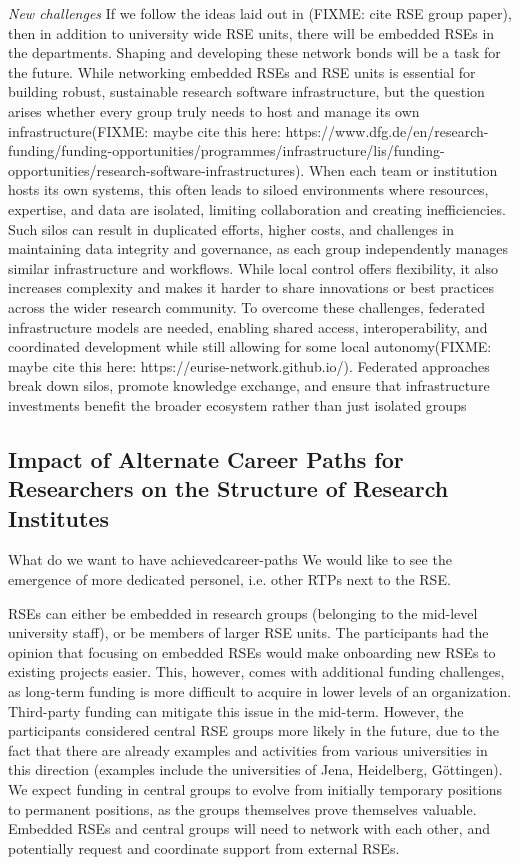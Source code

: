 \documentclass{eceasst}
\begin{document}
\emph{New challenges}
If we follow the ideas laid out in (FIXME: cite RSE group paper), then in addition to university wide RSE units,
there will be embedded RSEs in the departments. Shaping and developing these network bonds will be a task for the future.
While networking embedded RSEs and RSE units is essential for building robust, sustainable research software infrastructure, but the question arises whether every group truly needs to host and manage its own infrastructure(FIXME: maybe cite this here: https://www.dfg.de/en/research-funding/funding-opportunities/programmes/infrastructure/lis/funding-opportunities/research-software-infrastructures).
When each team or institution hosts its own systems, this often leads to siloed environments where resources, expertise, and data are isolated, limiting collaboration and creating inefficiencies. Such silos can result in duplicated efforts, higher costs, and challenges in maintaining data integrity and governance, as each group independently manages similar infrastructure and workflows. While local control offers flexibility, it also increases complexity and makes it harder to share innovations or best practices across the wider research community. To overcome these challenges, federated infrastructure models are needed, enabling shared access, interoperability, and coordinated development while still allowing for some local autonomy(FIXME: maybe cite this here: https://eurise-network.github.io/).
Federated approaches break down silos, promote knowledge exchange, and ensure that infrastructure investments benefit the broader ecosystem rather than just isolated groups

\subsection{Impact of Alternate Career Paths for Researchers on the Structure of Research Institutes}
\begin{whatis}{What do we want to have achieved}{career-paths}
We would like to see the emergence of more dedicated personel, i.e. other RTPs next to the RSE.
\end{whatis}
RSEs can either be embedded in research groups (belonging to the mid-level university staff),
or be members of larger RSE units.\cite{Kempf2025-draft}
The participants had the opinion that focusing on embedded RSEs would make onboarding new RSEs to existing projects easier.
This, however, comes with additional funding challenges,
as long-term funding is more difficult to acquire in lower levels of an organization.
Third-party funding can mitigate this issue in the mid-term.
However, the participants considered central RSE groups more likely in the future,
due to the fact that there are already examples and activities from various universities in this direction
(examples include the universities of Jena, Heidelberg, Göttingen).
We expect funding in central groups to evolve from initially temporary positions to permanent positions,
as the groups themselves prove themselves valuable.
Embedded RSEs and central groups will need to network with each other,
and potentially request and coordinate support from external RSEs.
\end{document}
